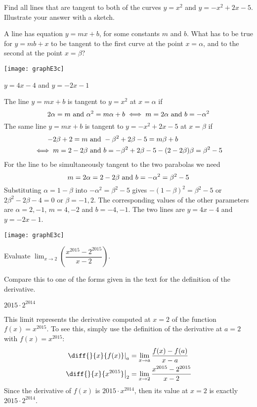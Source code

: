 \begin{Mquestion} [1998H]
Find all lines that are tangent to both of the curves $y=x^2$
and $y=-x^2+2x-5$. Illustrate your answer with a sketch.
\end{Mquestion}
\begin{hint} A line has equation $y=mx+b$, for some constants $m$ and $b$.
 What has to be true for $y=mb+x$ to be tangent to the first curve at the point $x=\alpha$, and to the second at the point $x=\beta$?
\end{hint}
\begin{answer}
\begin{center}
\texttt{[image: graphE3c]}
\end{center}
$y=4x-4$ and $y=-2x-1$
\end{answer}
\begin{solution}
The line $y=mx+b$ is tangent to $y=x^2$ at $x=\alpha$ if
$$
2\alpha=m\hbox{ and }\alpha^2=m\alpha+b
\iff m=2\alpha\hbox{ and }b=-\alpha^2
$$
The same line $y=mx+b$ is tangent to $y=-x^2+2x-5$ at $x=\beta$ if
\begin{align*}
-2\beta+2=m&\hbox{ and }-\beta^2+2\beta-5=m\beta+b\\
\iff m=2-2\beta&\hbox{ and }b=-\beta^2+2\beta-5-(2-2\beta)\beta=\beta^2-5
\end{align*}
For the line to be simultaneously tangent to the two parabolas we need
$$
m=2\alpha=2-2\beta\hbox{ and }b=-\alpha^2=\beta^2-5
$$
Substituting $\alpha=1-\beta$ into $-\alpha^2=\beta^2-5$ gives $-(1-\beta)^2=\beta^2-5$
or $2\beta^2-2\beta-4=0$ or $\beta=-1,2$. The corresponding values of the other
parameters are $\alpha=2,-1$, $m=4,-2$ and $b=-4,-1$. The two lines are
{$y=4x-4$ and $y=-2x-1$}.
\begin{center}
\texttt{[image: graphE3c]}
\end{center}
\end{solution}



\begin{question}[2015Q]
Evaluate $\displaystyle \lim_{x\to 2}\left(
\dfrac{x^{2015}-2^{2015}}{x-2}\right).$
\end{question}
\begin{hint}
Compare this to one of the forms given in the text for the definition of the derivative.
\end{hint}
\begin{answer}
{$2015\cdot 2^{2014}$}
\end{answer}
\begin{solution}
This limit represents the derivative computed at $x=2$ of the function $f(x)=x^{2015}$.
To see this, simply use the definition of the derivative at $a=2$ with $f(x)=x^{2015}$:
\begin{align*}
\left.\diff{}{x}\{f(x)\}\right|_{a} &= \lim_{x \to a}\frac{f(x)-f(a)}{x-a}\\
\left.\diff{}{x}\{x^{2015}\}\right|_{2} &=\lim_{x\to2} \frac{x^{2015}-2^{2015}}{x-2}
\end{align*}
Since the derivative of $f(x)$ is $2015\cdot x^{2014}$, then its value at $x=2$ is exactly $2015\cdot 2^{2014}$.
\end{solution}
